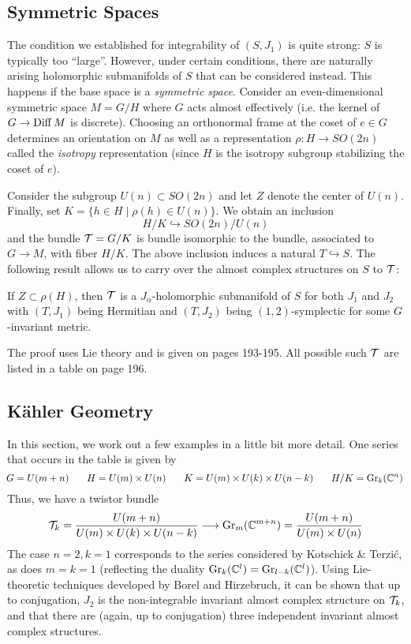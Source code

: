 \documentclass{scrartcl}
\begin{document}
\subsection{Symmetric Spaces}

The condition we established for integrability of $(S,J_1)$ is quite strong: $S$ is typically too ``large''. However, under certain conditions, there are naturally arising holomorphic submanifolds of $S$ that can be considered instead. This happens if the base space is a \emph{symmetric space}. Consider an even-dimensional symmetric space $M=G/H$ where $G$ acts almost effectively (i.e. the kernel of $G\to \operatorname{Diff} M$ is discrete). Choosing an orthonormal frame at the coset of $e\in G$ determines an orientation on $M$ as well as a representation $\rho:H\to SO(2n)$ called the \emph{isotropy} representation (since $H$ is the isotropy subgroup stabilizing the coset of $e$).

Consider the subgroup $U(n)\subset SO(2n)$ and let $Z$ denote the center of $U(n)$. Finally, set $K=\{h\in H\mid \rho(h)\in U(n)\}$. We obtain an inclusion
\begin{equation*}
	H/K \hookrightarrow SO(2n)/U(n)
\end{equation*} 
and the bundle $\mathcal{T}=G/K$ is bundle isomorphic to the bundle, associated to $G\to M$, with fiber $H/K$. The above inclusion induces a natural $T\hookrightarrow S$. The following result allows us to carry over the almost complex structures on $S$ to $\mathcal{T}$:

\begin{thm}\label{thm:symmetric}
	If $Z\subset \rho(H)$, then $\mathcal{T}$ is a $J_\alpha$-holomorphic submanifold of $S$ for both $J_1$ and $J_2$ with $(T,J_1)$ being Hermitian and $(T,J_2)$ being $(1,2)$-symplectic for some $G$-invariant metric.
\end{thm}
The proof uses Lie theory and is given on pages 193-195. All possible such $\mathcal{T}$ are listed in a table on page 196.

\subsection{K\"{a}hler Geometry}

In this section, we work out a few examples in a little bit more detail. One series that occurs in the table is given by
\begin{equation*}
	\!G=U(m+n)\qquad\! H=U(m)\times U(n)\qquad\! K=U(m)\times U(k)\times U(n-k) 
	\qquad\! H/K=\operatorname{Gr}_k(\mathbb{C}^n)
\end{equation*}
Thus, we have a twistor bundle
\begin{equation*}
	\mathcal{T}_k=\frac{U(m+n)}{U(m)\times U(k)\times U(n-k)}\longrightarrow \operatorname{Gr}_m(\mathbb{C}^{m+n})
	=\frac{U(m+n)}{U(m)\times U(n)}
\end{equation*}
The case $n=2,k=1$ corresponds to the series considered by Kotschick \& Terzi\'{c}, as does $m=k=1$ (reflecting the duality $\operatorname{Gr}_k(\mathbb{C}^l)=\operatorname{Gr}_{l-k}(\mathbb{C}^l)$). Using Lie-theoretic techniques developed by Borel and Hirzebruch, it can be shown that up to conjugation, $J_2$ is the non-integrable invariant almost complex structure on $\mathcal{T}_k$, and that there are (again, up to conjugation) three independent invariant almost complex structures. 
\end{document}
